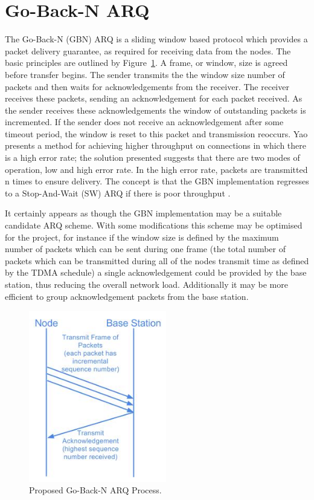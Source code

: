 \documentclass[parskip]{cs4rep}
\begin{document}
\section{Go-Back-N ARQ}

The Go-Back-N (GBN) ARQ is a sliding window based protocol which provides a packet delivery guarantee, as required for receiving data from the nodes. The basic principles are outlined by Figure~\ref{fig:GBN}. A frame, or window, size is agreed before transfer begins. The sender transmits the the window size number of packets and then waits for acknowledgements from the receiver. The receiver receives these packets, sending an acknowledgement for each packet received. As the sender receives these acknowledgements the window of outstanding packets is incremented. If the sender does not receive an acknowledgement after some timeout period, the window is reset to this packet and transmission reoccurs. Yao \cite{PR6} presents a method for achieving higher throughput on connections in which there is a high error rate; the solution presented suggests that there are two modes of operation, low and high error rate. In the high error rate, packets are transmitted n times to ensure delivery. The concept is that the GBN implementation regresses to a Stop-And-Wait (SW) ARQ if there is poor throughput \cite{PR7}.

It certainly appears as though the GBN implementation may be a suitable candidate ARQ scheme. With some modifications this scheme may be optimised for the project, for instance if the window size is defined by the maximum number of packets which can be sent during one frame (the total number of packets which can be transmitted during all of the nodes transmit time as defined by the TDMA schedule) a single acknowledgement could be provided by the base station, thus reducing the overall network load. Additionally it may be more efficient to group acknowledgement packets from the base station.

\begin{figure}
	\centering
	\includegraphics[width=60mm]{gbn.jpg}
	\caption{Proposed Go-Back-N ARQ Process.}
	\label{fig:GBN}
\end{figure}
\end{document}
